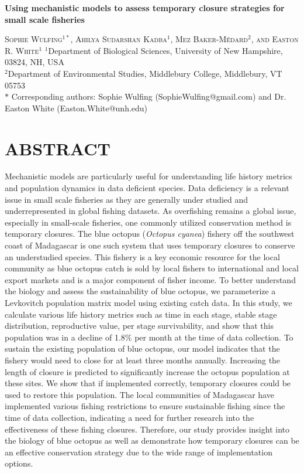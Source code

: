\documentclass[
]{article}
\author{}
\date{\vspace{-2.5em}}
\begin{document}
\begin{center}
    
\textbf{\Large Using mechanistic models to assess temporary closure strategies for small scale fisheries}
    
\textsc{Sophie Wulfing$^{1*}$, Ahilya Sudarshan Kadba$^{1}$, Mez Baker-Médard$^{2}$, and Easton R. White$^{1}$}
\vspace{3 mm}
\normalsize{\indent $^1$Department of Biological Sciences, University of New Hampshire, 03824, NH, USA \\ $^2$Department of Environmental Studies, Middlebury College, Middlebury, VT 05753\\}
$\text{*}$ Corresponding authors: Sophie Wulfing (SophieWulfing@gmail.com) and Dr. Easton White (Easton.White@unh.edu)
\end{center}

\newpage

\linenumbers

\hypertarget{abstract}{%
\section{ABSTRACT}\label{abstract}}

Mechanistic models are particularly useful for understanding life history metrics and population dynamics in data deficient species. Data deficiency is a relevant issue in small scale fisheries as they are generally under studied and underrepresented in global fishing datasets. As overfishing remains a global issue, especially in small-scale fisheries, one commonly utilized conservation method is temporary closures. The blue octopus (\emph{Octopus cyanea}) fishery off the southwest coast of Madagascar is one such system that uses temporary closures to conserve an understudied species. This fishery is a key economic resource for the local community as blue octopus catch is sold by local fishers to international and local export markets and is a major component of fisher income. To better understand the biology and assess the sustainability of blue octopus, we parameterize a Levkovitch population matrix model using existing catch data. In this study, we calculate various life history metrics such as time in each stage, stable stage distribution, reproductive value, per stage survivability, and show that this population was in a decline of 1.8\% per month at the time of data collection. To sustain the existing population of blue octopus, our model indicates that the fishery would need to close for at least three months annually. Increasing the length of closure is predicted to significantly increase the octopus population at these sites. We show that if implemented correctly, temporary closures could be used to restore this population. The local communities of Madagascar have implemented various fishing restrictions to ensure sustainable fishing since the time of data collection, indicating a need for further research into the effectiveness of these fishing closures. Therefore, our study provides insight into the biology of blue octopus as well as demonstrate how temporary closures can be an effective conservation strategy due to the wide range of implementation options.
\end{document}
